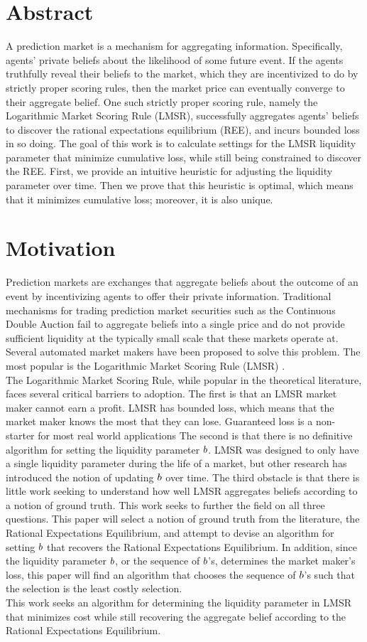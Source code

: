 \section{Abstract}
A prediction market is a mechanism for aggregating
information. Specifically, agents' private beliefs about the
likelihood of some future event. If the agents truthfully reveal
their beliefs to the market, which they are incentivized to do by
strictly proper scoring rules, then the market price can eventually 
converge to their aggregate belief. One such strictly proper scoring rule, 
namely the Logarithmic Market Scoring Rule (LMSR), successfully aggregates
agents' beliefs to discover the rational expectations equilibrium
(REE), and incurs bounded loss in so doing. The goal of this work is
to calculate settings for the LMSR liquidity parameter that minimize
cumulative loss, while still being constrained to discover the REE.
First, we provide an intuitive heuristic for adjusting the liquidity
parameter over time.  Then we prove that this heuristic is optimal, 
which means that it minimizes cumulative loss; moreover, it is also unique.

\section{Motivation}
Prediction markets are exchanges that aggregate beliefs about the outcome of an event by incentivizing agents to offer their private information. Traditional mechanisms for trading prediction market securities such as the Continuous Double Auction fail to aggregate beliefs into a single price and do not provide sufficient liquidity at the typically small scale that these markets operate at. Several automated market makers have been proposed to solve this problem. The most popular is the Logarithmic Market Scoring Rule (LMSR) \cite{Hanson2003}. \\

The Logarithmic Market Scoring Rule, while popular in the theoretical
literature, faces several critical barriers to adoption. The first is that
an LMSR market maker cannot earn a profit. LMSR has bounded loss, which means that the market maker knows the most that they can lose. Guaranteed loss is a non-starter for most
real world applications The second is that there is no definitive algorithm for setting the liquidity parameter $b$. LMSR was designed to only have a single liquidity parameter during the life of a market, but other research has introduced the notion of updating $b$ over time. The third obstacle is that there is little work seeking to understand how well LMSR aggregates beliefs according to a notion of ground truth. This work seeks to further the field on all three questions. This paper will select a notion of ground truth from the literature, the Rational Expectations Equilibrium, and attempt to devise an algorithm for setting $b$ that recovers the Rational Expectations Equilibrium. In addition, since the liquidity parameter $b$, or the sequence of $b$'s, determines the market maker's loss, this paper will find an algorithm that chooses the sequence of $b$'s such that the selection is the least costly selection.\\

This work seeks an algorithm for determining the liquidity parameter in LMSR that minimizes cost while still recovering the aggregate belief according to the Rational Expectations Equilibrium.\\
